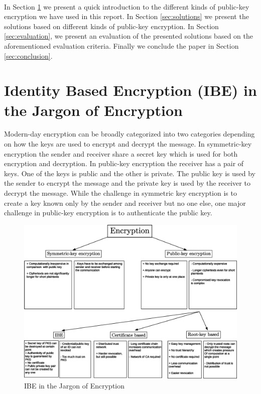 \documentclass[lnicst,sechang,a4paper]{svmultln}
\begin{document}
\paragraph{}
In Section \ref{sec:id_based_crypto} we present a quick introduction to the different kinds of public-key encryption we have used in this report. In Section \ref{sec:solutions} we present the solutions based on different kinds of public-key encryption. In Section \ref{sec:evaluation}, we present an evaluation of the presented solutions based on the aforementioned evaluation criteria. Finally we conclude the paper in Section \ref{sec:conclusion}.

\section{Identity Based Encryption (IBE) in the Jargon of Encryption} \label{sec:id_based_crypto}
Modern-day encryption can be broadly categorized into two categories depending on how the keys are used to encrypt and decrypt the message. In symmetric-key encryption the sender and receiver share a secret key which is used for both encryption and decryption. In public-key encryption the receiver has a pair of keys. One of the keys is public and the other is private. The public key is used by the sender to encrypt the message and the private key is used by the receiver to decrypt the message. While the challenge in symmetric key encryption is to create a key known only by the sender and receiver but no one else, one major challenge in public-key encryption is to authenticate the public key.
\begin{figure}
\begin{center}
  \includegraphics[width=.98\textwidth]{ibc_in_jargon_of_crypto.eps}
\caption{IBE in the Jargon of Encryption}
\label{fig:ibe_in_the_jargon_of_cryptography}       %
\end{center}
\end{figure}
\end{document}
